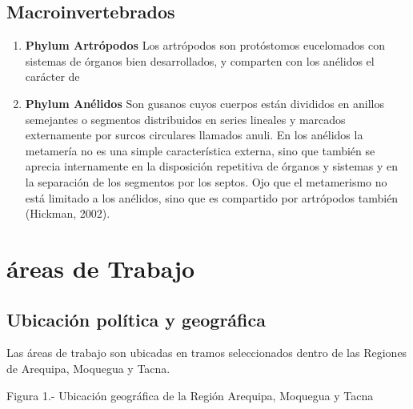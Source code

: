 \documentclass[5p,times,authoryear]{elsarticle}
\begin{document}
\subsection{Macroinvertebrados}
\begin{enumerate}
\item \textbf{Phylum Artr\'opodos} Los artr\'opodos son prot\'ostomos eucelomados con sistemas de \'organos bien desarrollados, y comparten con los an\'elidos el car\'acter de %


\item \textbf{Phylum An\'elidos} Son gusanos cuyos cuerpos est\'an divididos en anillos semejantes o segmentos distribuidos en series lineales y marcados externamente por surcos circulares llamados anuli. En los an\'elidos la metamer\'ia no es una simple caracter\'istica externa, sino que tambi\'en se aprecia internamente en la disposici\'on repetitiva de \'organos y sistemas y en la separaci\'on de los segmentos por los septos. Ojo que el metamerismo no est\'a limitado a los an\'elidos, sino que es compartido por artr\'opodos tambi\'en (Hickman, 2002).
\end{enumerate}

\section{\'areas de Trabajo}
\subsection{Ubicaci\'on pol\'itica y geogr\'afica}
Las \'areas de trabajo son ubicadas en tramos seleccionados dentro de las Regiones de Arequipa, Moquegua y Tacna.

Figura 1.- Ubicaci\'on geogr\'afica de la Regi\'on Arequipa, Moquegua y Tacna
\end{document}
